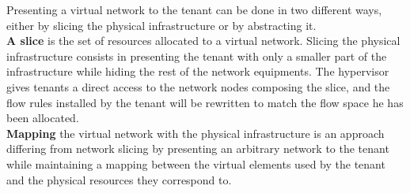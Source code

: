 Presenting a virtual network to the tenant can be done in two different ways, either by slicing the physical infrastructure or by abstracting it.\\
\textbf{A slice} is the set of resources allocated to a virtual network.
Slicing the physical infrastructure consists in presenting the tenant with only a smaller part of the infrastructure while hiding the rest of the network equipments.
The hypervisor gives tenants a direct access to the network nodes composing the slice, and the flow rules installed by the tenant will be rewritten to match the flow space he has been allocated.\\
\textbf{Mapping} the virtual network with the physical infrastructure is an approach differing from network slicing by presenting an arbitrary network to the tenant while maintaining a mapping between the virtual elements used by the tenant and the physical resources they correspond to.

 


